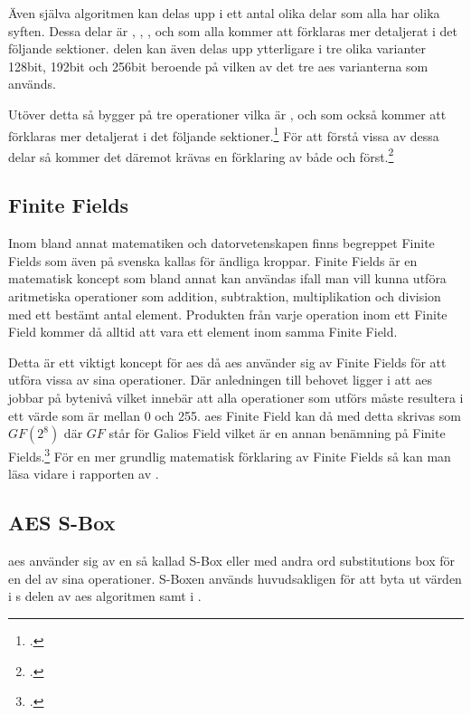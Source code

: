 Även själva algoritmen kan delas upp i ett antal olika delar som alla har olika syften. Dessa delar är , , ,
 och  som alla kommer att förklaras mer detaljerat i det följande sektioner.  delen kan även
delas upp ytterligare i tre olika varianter 128bit, 192bit och 256bit beroende på vilken av det tre \acrshort{aes} varianterna som används.

Utöver detta så bygger  på tre operationer vilka är ,  och
 som också kommer att förklaras mer detaljerat i det följande sektioner.\footcite{aes_wiki} För att förstå vissa av dessa delar
så kommer det däremot krävas en förklaring av både  och  först.\footcite{daemen1999aes}

\subsection{Finite Fields}
\label{sec:finite-fields}
Inom bland annat matematiken och datorvetenskapen finns begreppet Finite Fields
som även på svenska kallas för ändliga kroppar. Finite Fields är en matematisk
koncept som bland annat kan användas ifall man vill kunna utföra aritmetiska
operationer som addition, subtraktion, multiplikation och division med ett
bestämt antal element. Produkten från varje operation inom ett Finite Field
kommer då alltid att vara ett element inom samma Finite Field.

Detta är ett viktigt koncept för \acrshort{aes} då \acrshort{aes} använder sig av
Finite Fields för att utföra vissa av sina operationer. Där anledningen till behovet
ligger i att \acrshort{aes} jobbar på bytenivå vilket innebär att alla operationer
som utförs måste resultera i ett värde som är mellan 0 och 255. \acrshort{aes} Finite Field
kan då med detta skrivas som $GF(2^8)$ där $GF$ står för Galios Field vilket är
en annan benämning på Finite Fields.\footcite{finitefield_wiki} För en mer grundlig matematisk förklaring av Finite Fields så kan man läsa vidare i rapporten
 av \citeauthor{boman2016andliga}.

\subsection{AES S-Box}
\label{sec:aes-sbox}
\acrshort{aes} använder sig av en så kallad S-Box eller med andra ord substitutions box
för en del av sina operationer. S-Boxen används huvudsakligen för att byta ut värden
i s delen av \acrshort{aes} algoritmen samt i
.

